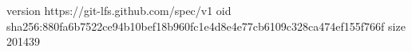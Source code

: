 version https://git-lfs.github.com/spec/v1
oid sha256:880fa6b7522ce94b10bef18b960fc1e4d8e4e77cb6109c328ca474ef155f766f
size 201439
